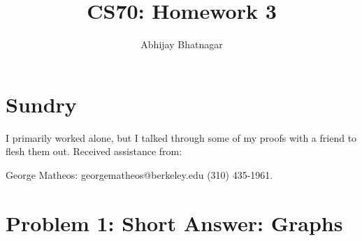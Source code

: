 \documentclass[11pt, notitlepage]{report}
\makeatletter
\newcommand*{\toccontents}{\@starttoc{toc}}
\makeatother
\begin{document}
   \title{CS70: Homework 3}
   \author{Abhijay Bhatnagar}
   \maketitle
   \toccontents



\setcounter{secnumdepth}{0} %

\section{Sundry}

I primarily worked alone, but I talked through some of my proofs with a friend to flesh them out. Received assistance from:

 George Matheos: georgematheos@berkeley.edu
(310) 435-1961.

\newpage
\section{Problem 1: Short Answer: Graphs}
\end{document}
